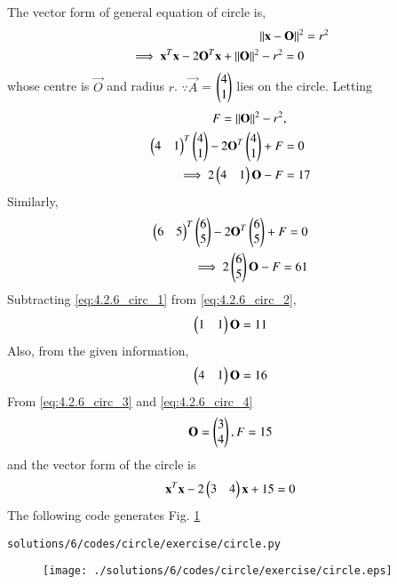 The vector form of general equation of circle is, 
\begin{align} 
\left\lVert\mathbf{x}- \mathbf{O}\right\rVert^2 &= r^2
\\
\implies 
\mathbf{x}^T\mathbf{x}-2\mathbf{O}^T\mathbf{x}+\left\lVert\mathbf{O}\right\rVert^2-r^2=0 
\label{eq:4.2.6_circ}
\end{align}
whose centre is $\vec{O}$ and radius $r$.
$\because \vec{A}$ = $\begin{pmatrix}4\\1\end{pmatrix}$ lies on the circle. 
Letting 
\begin{align} 
F=\left\lVert\mathbf{O}\right\rVert^2-r^2&,
\\
\begin{pmatrix}4 & 1\end{pmatrix}^T\begin{pmatrix}4\\1\end{pmatrix}-2\mathbf{O}^T\begin{pmatrix}4\\1\end{pmatrix}+F&=0
\\
\implies 2\begin{pmatrix}4&1\end{pmatrix}\mathbf{O} - F &= 17 \label{eq:4.2.6_circ_1}
\end{align}
Similarly, 
\begin{align}
\begin{pmatrix}6 & 5\end{pmatrix}^T\begin{pmatrix}6\\5\end{pmatrix}-2\mathbf{O}^T\begin{pmatrix}6\\5\end{pmatrix}+F=0
\\
\implies 2\begin{pmatrix}6\\5\end{pmatrix}\mathbf{O} - F = 61 \label{eq:4.2.6_circ_2}
\end{align}
Subtracting  \ref{eq:4.2.6_circ_1} from \ref{eq:4.2.6_circ_2},
\begin{align} 
\begin{pmatrix}1&1\end{pmatrix}\mathbf{O}=11 \label{eq:4.2.6_circ_4}
\end{align}
Also, from the given information, 
\begin{align} 
\begin{pmatrix}4&1\end{pmatrix}\mathbf{O}=16 \label{eq:4.2.6_circ_3}
\end{align}
From \ref{eq:4.2.6_circ_3} and \ref{eq:4.2.6_circ_4}
\begin{align} 
 \mathbf{O} = \begin{pmatrix}3\\4\end{pmatrix}, F = 15
\end{align}
and the vector form of the circle is 
\begin{align}
\mathbf{x}^T\mathbf{x}-2\begin{pmatrix}3&4\end{pmatrix}\mathbf{x}+15=0
\end{align}
The following code generates Fig. \ref{fig:4.2.6_circ_1}

\begin{lstlisting}
solutions/6/codes/circle/exercise/circle.py
\end{lstlisting}

\begin{figure}[!ht]
\centering
\texttt{[image: ./solutions/6/codes/circle/exercise/circle.eps]}
\caption{}
\label{fig:4.2.6_circ_1}
\end{figure}

